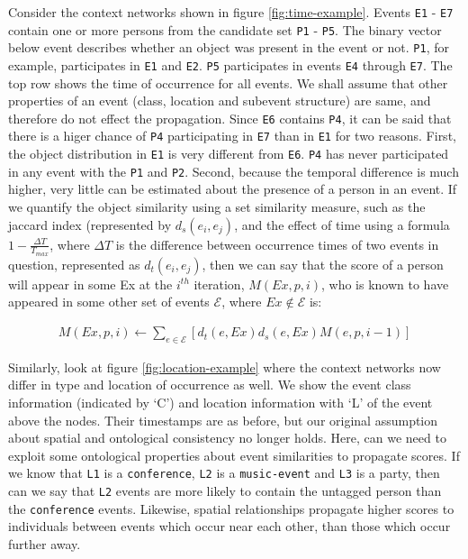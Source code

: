 Consider the context networks shown in figure \ref{fig:time-example}. Events \texttt{E1} - \texttt{E7} contain one or more persons from the candidate set \texttt{P1} - \texttt{P5}. The binary vector below event describes whether an object was present in the event or not. \texttt{P1}, for example, participates in \texttt{E1} and \texttt{E2}. \texttt{P5} participates in events \texttt{E4} through \texttt{E7}. The top row shows the time of occurrence for all events. We shall assume that other properties of an event (class, location and subevent structure) are same, and therefore do not effect the propagation. Since \texttt{E6} contains \texttt{P4}, it can be said that there is a higer chance of \texttt{P4} participating in \texttt{E7} than in \texttt{E1} for two reasons. First, the object distribution in \texttt{E1} is very different from \texttt{E6}. \texttt{P4} has never participated in any event with the \texttt{P1} and \texttt{P2}. Second, because the temporal difference is much higher, very little can be estimated about the presence of a person in an event. If we quantify the object similarity using a set similarity measure, such as the jaccard index (represented by $d_s(e_i, e_j)$, and the effect of time using a formula $1 - \frac{\Delta T}{T_{max}}$, where $\Delta T$ is the difference between occurrence times of two events in question, represented as $d_t(e_i, e_j)$, then we can say that the score of a person will appear in some Ex at the $i^{th}$ iteration, $M(Ex, p, i)$, who is known to have appeared in some other set of events $\mathcal{E}$, where $Ex \notin \mathcal{E}$ is:

\begin{align}
\label{eq:puirank}
M(Ex, p, i) \leftarrow \sum_{e \in \mathcal{E}}[ d_t (e, Ex) d_s (e, Ex) M(e, p, i-1) ]
\end{align}

Similarly, look at figure \ref{fig:location-example} where the context networks now differ in type and location of occurrence as well. We show the event class information (indicated by `C') and location information with `L' of the event above the nodes. Their timestamps are as before, but our original assumption about spatial and ontological consistency no longer holds. Here, can we need to exploit some ontological properties about event similarities to propagate scores. If we know that \texttt{L1} is a \texttt{conference}, \texttt{L2} is a \texttt{music-event} and \texttt{L3} is a party, then can we say that \texttt{L2} events are more likely to contain the untagged person than the \texttt{conference} events. Likewise, spatial relationships propagate higher scores to individuals between events which occur near each other, than those which occur further away.

